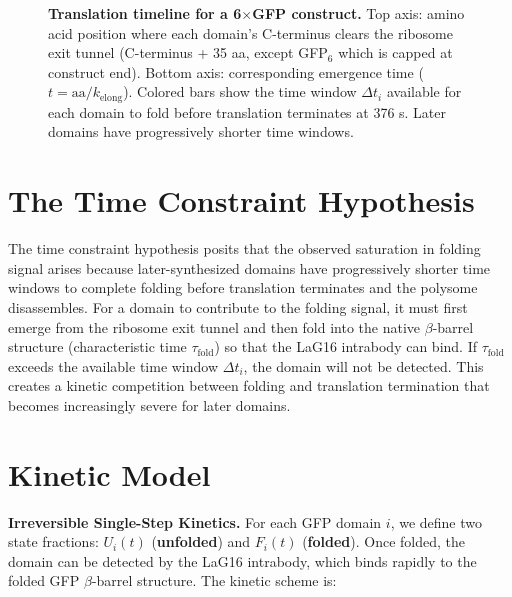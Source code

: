 \documentclass[11pt,a4paper]{article}
\newcommand{\kfold}{k_{\text{fold}}}
\newcommand{\taufold}{\tau_{\text{fold}}}
\begin{document}
\begin{figure}[H]
\begin{tikzpicture}[scale=0.85]
\end{tikzpicture}

\caption{\textbf{Translation timeline for a 6$\times$GFP construct.} Top axis: amino acid position where each domain's C-terminus clears the ribosome exit tunnel (C-terminus + 35 aa, except GFP$_6$ which is capped at construct end). Bottom axis: corresponding emergence time ($t = \text{aa}/k_{\text{elong}}$). Colored bars show the time window $\Delta t_i$ available for each domain to fold before translation terminates at 376 s. Later domains have progressively shorter time windows.}
\label{fig:timeline}
\end{figure}


\section{The Time Constraint Hypothesis}

The time constraint hypothesis posits that the observed saturation in folding signal arises because later-synthesized domains have progressively shorter time windows to complete folding before translation terminates and the polysome disassembles. For a domain to contribute to the folding signal, it must first emerge from the ribosome exit tunnel and then fold into the native $\beta$-barrel structure (characteristic time $\taufold$) so that the LaG16 intrabody can bind. If $\taufold$ exceeds the available time window $\Delta t_i$, the domain will not be detected. This creates a kinetic competition between folding and translation termination that becomes increasingly severe for later domains.

\section{Kinetic Model}

\textbf{Irreversible Single-Step Kinetics.} For each GFP domain $i$, we define two state fractions: $U_i(t)$ (\textbf{unfolded}) and $F_i(t)$ (\textbf{folded}). Once folded, the domain can be detected by the LaG16 intrabody, which binds rapidly to the folded GFP $\beta$-barrel structure. The kinetic scheme is:

\begin{center}
\end{center}
\end{document}
